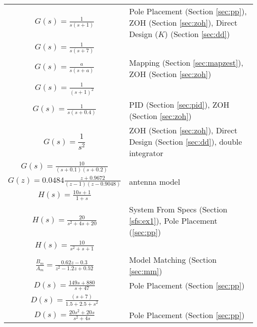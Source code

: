 \documentclass{article}
\begin{document}
{\tabulinesep=1.5mm
\begin{tabu}{|c|l|}
\hline
$\displaystyle G(s) = \frac{1}{s(s + 1)}$ & Pole Placement (Section \ref{sec:pp}), ZOH (Section \ref{sec:zoh}), Direct Design ($K$) (Section \ref{sec:dd}) \\
$\displaystyle G(s) = \frac{1}{s(s + 7)}$ & \\
$\displaystyle G(s) = \frac{a}{s(s + a)}$ & Mapping (Section \ref{sec:mapzest}), ZOH (Section \ref{sec:zoh}) \\
$\displaystyle G(s) = \frac{1}{(s + 1)^2}$ & \\
$\displaystyle G(s) = \frac{1}{s(s + 0.4)}$ & PID (Section \ref{sec:pid}), ZOH (Section \ref{sec:zoh}) \\
$\displaystyle G(s) = \dfrac{1}{s^2}$ & ZOH (Section \ref{sec:zoh}), Direct Design (Section \ref{sec:dd}), double integrator \\
$\displaystyle G(s) = \frac{10}{(s + 0.1)(s + 0.2)}$ & \\
$\displaystyle G(z) = 0.0484 \frac{z + 0.9672}{(z - 1)(z - 0.9048)}$ & antenna model\autocite[Pg. 261]{franklin1998digital} \\
\hline
$\displaystyle H(s) = \frac{10s + 1}{1 + s}$ & \\
$\displaystyle H(s) = \frac{20}{s^2 + 4s + 20}$ &  System From Specs (Section \ref{sfs:ex1}), Pole Placement (\ref{sec:pp}) \\
$\displaystyle H(s) = \frac{10}{s^2 + s + 1}$ & \\
$\displaystyle \frac{B_m}{A_m} = \frac{0.62z - 0.3}{z^2 - 1.2z + 0.52}$ & Model Matching (Section \ref{sec:mm})\autocite[Pg. 532]{ogata1995discrete} \\

\hline
$\displaystyle D(s) = \frac{149s + 880}{s + 47}$ & Pole Placement (Section \ref{sec:pp}) \\
$\displaystyle D(s) = \frac{(s + 7)}{1.5 + 2.5 + s^2}$ & \\
$\displaystyle D(s) = \frac{20s^2 + 20s}{s^2 + 4s}$ & Pole Placement (Section \ref{sec:pp}) \\
\hline
\end{tabu}}
\end{document}
